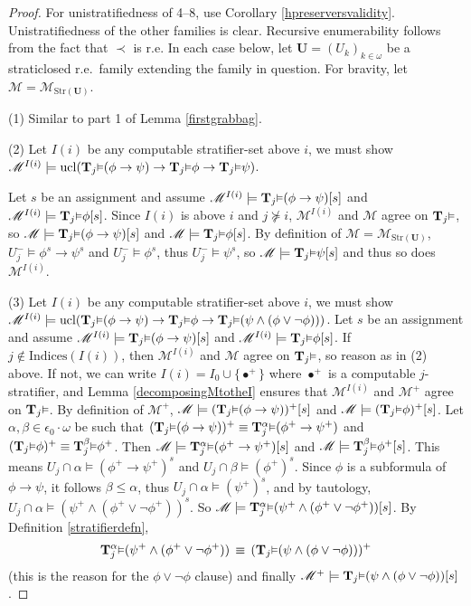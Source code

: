 \documentclass[reqno]{article}
\theoremstyle{definition}
\def\M{\mathscr{M}}
\def\T{\mathbf{T}}
\def\U{\mathbf{U}}
\def\indices{\mathrm{Indices}}
\def\epom{\epsilon_0\cdot\omega}
\renewcommand{\Pr}[1]{\T_{#1}\mbox{\small${\vDash}$}}
\newcommand{\Prr}[2]{\T^{#1}_{#2}\mbox{\small${\vDash}$}}
\newcommand{\ucl}[1]{\mathrm{ucl}(#1)}
\newcommand{\str}[1]{\mathrm{Str}(#1)} \newcommand{\Str}[1]{\str{#1}}
\begin{document}
\begin{proof}
For
unistratifiedness of 4--8,
use Corollary \ref{hpreserversvalidity}.
Unistratifiedness of the other families is clear.
Recursive enumerability follows from the fact that $\prec$
is r.e.
In each
case below, let $\U=(U_k)_{k\in\omega}$ be a straticlosed r.e.~family
extending the family
in question.
For bravity, let $\M=\M_{\str\U}$.

\item
(1) Similar to part 1 of Lemma \ref{firstgrabbag}.

\item
(2) Let $I(i)$ be any computable stratifier-set above $i$, we must show
$\M^{I(i)}\models \ucl{\Pr j(\phi\rightarrow\psi)
\rightarrow\Pr j\phi\rightarrow\Pr j\psi}$.

Let $s$ be an assignment and assume
$\M^{I(i)}\models \Pr j(\phi\rightarrow\psi)[s]$
and $\M^{I(i)}\models\Pr j\phi[s]$.
Since $I(i)$ is above $i$ and $j\not\succeq i$, $\M^{I(i)}$ and $\M$
agree on $\Pr j$, so
$\M\models \Pr j(\phi\rightarrow\psi)[s]$
and $\M\models\Pr j\phi[s]$.
By definition of $\M=\M_{\str\U}$, $U^-_j\models\phi^s\rightarrow\psi^s$
and $U^-_j\models\phi^s$, thus $U^-_j\models\psi^s$, so
$\M\models \Pr j\psi[s]$ and thus so does $\M^{I(i)}$.

\item
(3) Let $I(i)$ be any computable stratifier-set above $i$,
we must show
$\M^{I(i)}\models \ucl{\Pr j(\phi\rightarrow\psi)\rightarrow \Pr j\phi\rightarrow \Pr j(\psi\wedge(\phi\vee\neg\phi))}$.
Let $s$ be an assignment and assume $\M^{I(i)}\models \Pr j(\phi\rightarrow\psi)[s]$
and $\M^{I(i)}\models\Pr j\phi[s]$.
If $j\not\in\indices(I(i))$, then $\M^{I(i)}$ and $\M$
agree on $\Pr j$, so reason as in (2) above.
If not, we can write $I(i)=I_0\cup\{\bullet^+\}$ where $\bullet^+$ is a
computable $j$-stratifier, and Lemma \ref{decomposingMtotheI} ensures that
$\M^{I(i)}$ and $\M^+$ agree on $\Pr j$.
By definition of $\M^+$, $\M\models(\Pr j(\phi\rightarrow\psi))^+[s]$
and $\M\models(\Pr j\phi)^+[s]$.
Let $\alpha,\beta\in\epom$ be such that $(\Pr j(\phi\rightarrow\psi))^+\equiv\Prr\alpha j(\phi^+\rightarrow\psi^+)$
and $(\Pr j\phi)^+\equiv\Prr\beta j\phi^+$.
Then
$\M\models\Prr\alpha j (\phi^+\rightarrow\psi^+)[s]$ and $\M\models\Prr\beta j\phi^+[s]$.
This means $U_j\cap\alpha\models(\phi^+\rightarrow\psi^+)^s$ and $U_j\cap\beta\models(\phi^+)^s$.
Since $\phi$ is a subformula of $\phi\rightarrow\psi$, it follows $\beta\leq\alpha$, thus
$U_j\cap\alpha\models (\psi^+)^s$, and by tautology,
$U_j\cap\alpha\models(\psi^+\wedge(\phi^+\vee\neg\phi^+))^s$.
So $\M\models\Prr\alpha j(\psi^+\wedge(\phi^+\vee\neg\phi^+))[s]$.
By Definition \ref{stratifierdefn},
\[
\Prr\alpha j(\psi^+\wedge(\phi^+\vee\neg\phi^+)) \,\equiv\, (\Pr j(\psi\wedge(\phi\vee\neg\phi)))^+
\]
(this is the reason for the $\phi\vee\neg\phi$ clause)
and finally $\M^+\models \Pr j(\psi\wedge(\phi\vee\neg\phi))[s]$.


\end{proof}
\end{document}
